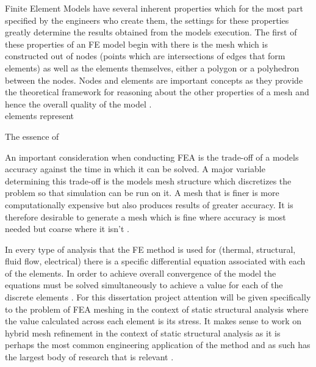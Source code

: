 \documentclass{article}
\begin{document}
Finite Element Models have several inherent properties which for the most part specified by the engineers who create them, the settings for these properties greatly determine the results obtained from the models execution. The first of these properties of an FE model  begin with there is the mesh which is constructed out of nodes (points which are intersections of edges that form elements) as well as the elements themselves, either a polygon or a polyhedron between the nodes. Nodes and elements are important concepts as they provide the theoretical framework for reasoning about the other properties of a mesh and hence the overall quality of the model \cite{IntroductionToFE}.\\ elements represent

The essence of 







\noindent
An important consideration when conducting FEA is the trade-off of a models accuracy against the time in which it can be solved. A major variable determining this trade-off is the models mesh structure which discretizes the problem so that simulation can be run on it. A mesh that is finer is more computationally expensive but also produces results of greater accuracy. It is therefore desirable to generate a mesh which is fine where accuracy is most needed but coarse where it isn't \cite{cite04}. 

\noindent
In every type of analysis that the FE method is used for (thermal, structural, fluid flow, electrical) there is a specific differential equation associated with each of the elements. In order to achieve overall convergence of the model the equations must be solved simultaneously to achieve a value for each of the discrete elements \cite{IntroductionToFE}. For this dissertation project attention will be given specifically to the problem of FEA meshing in the context of static structural analysis where the value calculated across each element is its stress. It makes sense to work on hybrid mesh refinement in the context of static structural analysis as it is perhaps the most common engineering application of the method and as such has the largest body of research that is relevant \cite{DolsakPaper94}\cite{IntroductionToFE}.\\
\end{document}
